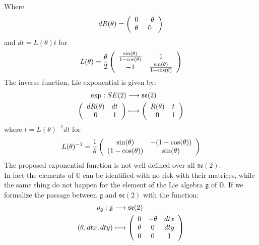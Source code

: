 Where 
\begin{align*}
dR(\theta) = 
\left (
\begin{array} {c c }
0 & -\theta \\
\theta & 0 
\end{array}
\right )
\end{align*}
and $dt = L(\theta)t$ for 
\begin{align*}
L(\theta) = 
\frac{\theta}{2}
\left (
\begin{array} {c c }
\frac{\sin(\theta)}{1-\cos(\theta)} & 1 \\
-1 & \frac{\sin(\theta)}{1-\cos(\theta)}
\end{array}
\right )
\end{align*}
The inverse function, Lie exponential is given by:
\begin{align*}
\exp : SE(2) & \longrightarrow \mathfrak{se}(2) 
\\
\left (
\begin{array} {c c }
dR(\theta) & dt \\
0 & 1 
\end{array}
\right )
&\longmapsto  
\left (
\begin{array} {c c }
R(\theta) & t \\
0 & 1 
\end{array}
\right )
\end{align*}
where $t = L(\theta)^{-1}dt$ for 
\begin{align*}
L(\theta)^{-1} = 
\frac{1}{\theta}
\left (
\begin{array} {c c }
\sin(\theta) & -(1-\cos(\theta)) \\
(1-\cos(\theta)) & \sin(\theta)
\end{array}
\right )
\end{align*}
The proposed exponential function is not well defined over all $\mathfrak{se}(2)$.\\
In fact the elements of $\mathbb{G}$ can be identified with no risk with their matrices, while the same thing do not happen for the element of the Lie algebra $\mathfrak{g}$ of $\mathbb{G}$. 
If we formalize the passage between $\mathfrak{g} $ and $\mathfrak{se}(2)$ with the function:
\begin{align*}
\rho_{\mathfrak{g}} : \mathfrak{g} &\longrightarrow  \mathfrak{se}(2)\\
(\theta, dtx, dty) 
& \longmapsto
\left (
\begin{array} {c c c }
0 & -\theta & dtx \\
\theta & 0 & dty\\
0 & 0 &  1
\end{array}
\right )
\end{align*}

